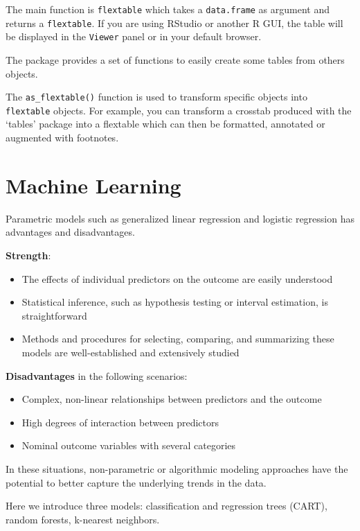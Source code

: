 \documentclass[
]{book}
\providecommand{\tightlist}{%
  \setlength{\itemsep}{0pt}\setlength{\parskip}{0pt}}
\theoremstyle{definition}
\theoremstyle{definition}
\theoremstyle{definition}
\theoremstyle{definition}
\theoremstyle{remark}
\begin{document}
The main function is \texttt{flextable} which takes a \texttt{data.frame} as argument and returns a \texttt{flextable}. If you are using RStudio or another R GUI, the table will be displayed in the \texttt{Viewer} panel or in your default browser.

The package provides a set of functions to easily create some tables from others objects.

The \texttt{as\_flextable()} function is used to transform specific objects into \texttt{flextable} objects. For example, you can transform a crosstab produced with the `tables' package into a flextable which can then be formatted, annotated or augmented with footnotes.

\chapter{Machine Learning}\label{machine-learning}

Parametric models such as generalized linear regression and logistic regression has advantages and disadvantages.

\textbf{Strength}:

\begin{itemize}
\tightlist
\item
  The effects of individual predictors on the outcome are easily understood
\item
  Statistical inference, such as hypothesis testing or interval estimation, is straightforward
\item
  Methods and procedures for selecting, comparing, and summarizing these models are well-established and extensively studied
\end{itemize}

\textbf{Disadvantages} in the following scenarios:

\begin{itemize}
\tightlist
\item
  Complex, non-linear relationships between predictors and the outcome
\item
  High degrees of interaction between predictors
\item
  Nominal outcome variables with several categories
\end{itemize}

In these situations, non-parametric or algorithmic modeling approaches have the potential to better capture the underlying trends in the data.

Here we introduce three models: classification and regression trees (CART), random forests, k-nearest neighbors.
\end{document}
